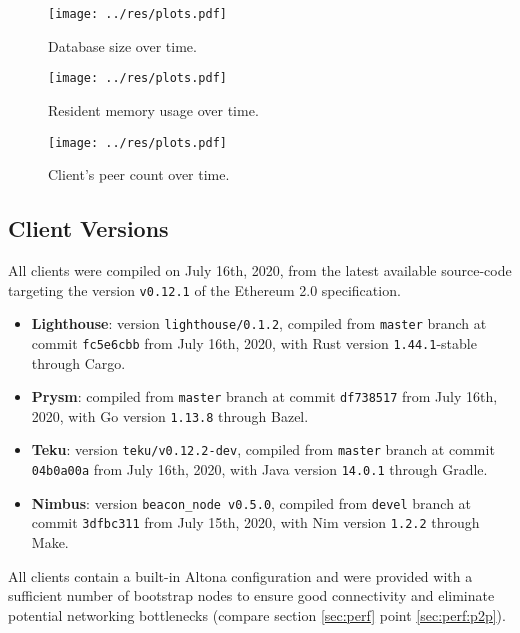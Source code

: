 \documentclass[twoside,twocolumn]{article}
\begin{document}
\begin{figure}[t]
	\centering
	\texttt{[image: ../res/plots.pdf]}
	\caption{Database size over time.}
	\label{img:db}
\end{figure}

\begin{figure}[t]
	\centering
	\texttt{[image: ../res/plots.pdf]}
	\caption{Resident memory usage over time.}
	\label{img:mem}
\end{figure}

\begin{figure}[t]
	\centering
	\texttt{[image: ../res/plots.pdf]}
	\caption{Client's peer count over time.}
	\label{img:per}
\end{figure}

\subsection{Client Versions}
All clients were compiled on July 16th, 2020, from the latest available source-code targeting the version \texttt{v0.12.1} of the Ethereum 2.0 specification.

\begin{itemize}
\item \textbf{Lighthouse}: version \texttt{lighthouse/0.1.2}, compiled from \texttt{master} branch at commit \texttt{fc5e6cbb} from July 16th, 2020, with Rust version \texttt{1.44.1}-stable through Cargo.
\item \textbf{Prysm}: compiled from \texttt{master} branch at commit \texttt{df738517} from July 16th, 2020, with Go version \texttt{1.13.8} through Bazel.
\item \textbf{Teku}: version \texttt{teku/v0.12.2-dev}, compiled from \texttt{master} branch at commit \texttt{04b0a00a} from July 16th, 2020, with Java version \texttt{14.0.1} through Gradle.
\item \textbf{Nimbus}: version \texttt{beacon\_node v0.5.0}, compiled from \texttt{devel} branch at commit \texttt{3dfbc311} from July 15th, 2020, with Nim version \texttt{1.2.2} through Make.
\end{itemize}

All clients contain a built-in Altona configuration and were provided with a sufficient number of bootstrap nodes to ensure good connectivity and eliminate potential networking bottlenecks (compare section \ref{sec:perf} point \ref{sec:perf:p2p}).\par
\end{document}
